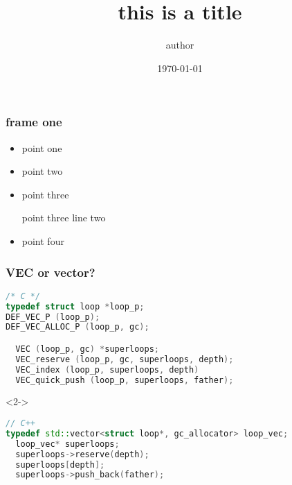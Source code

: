 \documentclass{beamer}
\title{this is a title}
\author{author}
\institute{institute}
\date{\today}
\begin{document}
\begin{frame}
\titlepage
\end{frame}



\begin{frame}
\frametitle{frame one}

\begin{itemize}
\item
point one
\item
point two
\item
point three

point three line two
\item
point four
\end{itemize}

\end{frame}

\begin{frame}[fragile]
\frametitle{VEC or vector?}

\begin{lstlisting}[language=C++]
/* C */
typedef struct loop *loop_p;
DEF_VEC_P (loop_p);
DEF_VEC_ALLOC_P (loop_p, gc);

  VEC (loop_p, gc) *superloops;
  VEC_reserve (loop_p, gc, superloops, depth);
  VEC_index (loop_p, superloops, depth)
  VEC_quick_push (loop_p, superloops, father);
\end{lstlisting}

\begin{uncoverenv}<2->
\begin{lstlisting}[language=C++]
// C++
typedef std::vector<struct loop*, gc_allocator> loop_vec;
  loop_vec* superloops;
  superloops->reserve(depth);
  superloops[depth];
  superloops->push_back(father);
\end{lstlisting}
\end{uncoverenv}

\end{frame}
\end{document}
